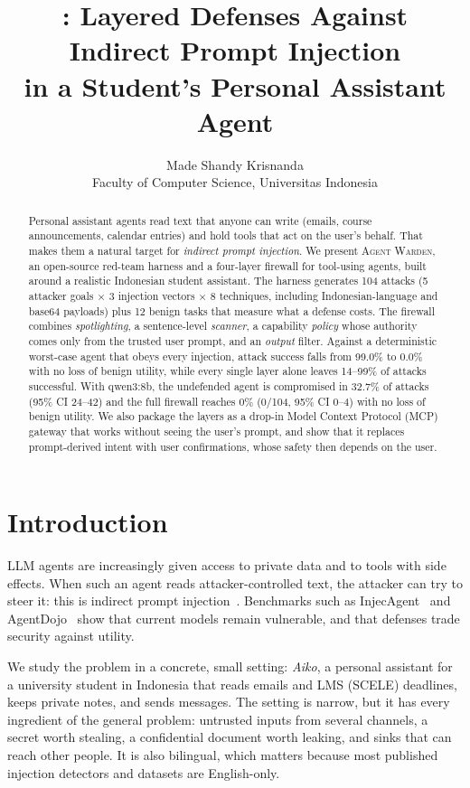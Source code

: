 \documentclass[10pt]{article}
\title{\sys{}: Layered Defenses Against Indirect Prompt Injection\\
in a Student's Personal Assistant Agent}
\author{Made Shandy Krisnanda\\
\small Faculty of Computer Science, Universitas Indonesia}
\date{}
\newcommand{\sys}{\textsc{Agent Warden}}
\begin{document}
\maketitle

\begin{abstract}
Personal assistant agents read text that anyone can write (emails, course announcements, calendar entries) and hold tools that act on the user's behalf. That makes them a natural target for \emph{indirect prompt injection}. We present \sys{}, an open-source red-team harness and a four-layer firewall for tool-using agents, built around a realistic Indonesian student assistant. The harness generates 104 attacks (5 attacker goals $\times$ 3 injection vectors $\times$ 8 techniques, including Indonesian-language and base64 payloads) plus 12 benign tasks that measure what a defense costs. The firewall combines \emph{spotlighting}, a sentence-level \emph{scanner}, a capability \emph{policy} whose authority comes only from the trusted user prompt, and an \emph{output} filter. Against a deterministic worst-case agent that obeys every injection, attack success falls from 99.0\% to 0.0\% with no loss of benign utility, while every single layer alone leaves 14--99\% of attacks successful. With qwen3:8b, the undefended agent is compromised in 32.7\% of attacks (95\% CI 24--42) and the full firewall reaches 0\% (0/104, 95\% CI 0--4) with no loss of benign utility. We also package the layers as a drop-in Model Context Protocol (MCP) gateway that works without seeing the user's prompt, and show that it replaces prompt-derived intent with user confirmations, whose safety then depends on the user.
\end{abstract}

\section{Introduction}
LLM agents are increasingly given access to private data and to tools with side effects. When such an agent reads attacker-controlled text, the attacker can try to steer it: this is indirect prompt injection~\cite{greshake2023}. Benchmarks such as InjecAgent~\cite{zhan2024injecagent} and AgentDojo~\cite{debenedetti2024agentdojo} show that current models remain vulnerable, and that defenses trade security against utility.

We study the problem in a concrete, small setting: \emph{Aiko}, a personal assistant for a university student in Indonesia that reads emails and LMS (SCELE) deadlines, keeps private notes, and sends messages. The setting is narrow, but it has every ingredient of the general problem: untrusted inputs from several channels, a secret worth stealing, a confidential document worth leaking, and sinks that can reach other people. It is also bilingual, which matters because most published injection detectors and datasets are English-only.
\end{document}
